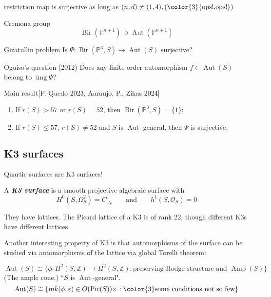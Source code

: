 \begin{thm}\leavevmode
	restriction map is surjective as long as \((n,d) \neq (1,4), ({\color{3}{\text{ops!,ops!}}})\)
\end{thm}

Cremona group
\[\operatorname{Bir}(\mathbb{P}^{n+1}) \supset\operatorname{Aut}(\mathbb{P}^{n+1})\]

\begin{thing7}{Gizatullin problem}\leavevmode
Is \(\Psi: \operatorname{Bir}(\mathbb{P}^3,S) \longrightarrow \operatorname{Aut}(S)\) surjective?
\end{thing7}

\begin{thing4}{Oguiso's question (2012)}\leavevmode
Does any finite order automorphism \(f \in \operatorname{Aut}(S)\) belong to \(\operatorname{img}\Psi\)?
\end{thing4}

\begin{thing6}{Main result}[P.-Quedo 2023, Aaraujo, P., Zikas 2024]\leavevmode
\begin{enumerate}[label=(\roman*)]
\item If \(r(S)> 57\) or \(r(S)=52\), then \(\operatorname{Bir}(\mathbb{P}^3,S)=\{1\}\);
\item If \(r(S) \leq 57\), \(r(S) \neq 52\) and \(S\) is \(\operatorname{Aut}\)-general, then \(\Psi\) is surjective.
\end{enumerate}
\end{thing6}


\subsection{K3 surfaces}

Quartic surfaces are K3 surfaces!

\begin{defn}\leavevmode
A \textit{\textbf{K3 surface}} is a smooth projective algebraic surface with
\[H^{0}(S,\Omega^{2}_S) = C_{\omega_S}\qquad \text{and} \qquad h^1(S,\mathcal{O}_S)=0\]
\end{defn}

They have lattices. The Picard lattice of a K3 is of rank 22, though different K3s have different lattices.

Another interesting property of K3 is that automorphisms of the surface can be studied via automorphisms of the lattice via global Torelli theorem:

\begin{thm}\leavevmode
\[\operatorname{Aut}(S)\cong \{\phi:H^{2}(S,\mathbb{Z})\to H^{2}(S,\mathbb{Z}):\text{preserving Hodge structure and }\operatorname{Am p}(S) \}\]
(The ample cone.) ``\(S\) is \(\operatorname{Aut}\)-general".
\[\operatorname{Aut}(S) \cong\{mk(\phi,\varepsilon) \in O(\operatorname{Pic}(S) ) \times :{\color{3}\text{some conditions not so few} }\}\]
\end{thm}

